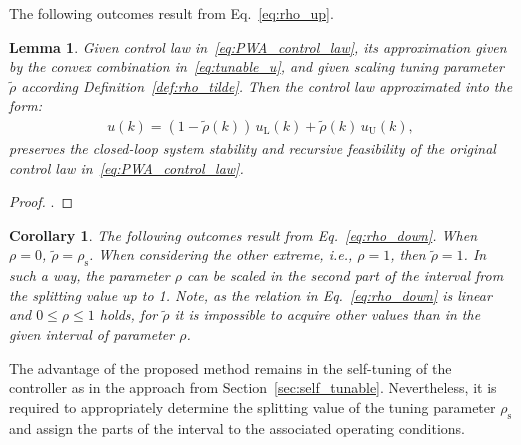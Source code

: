 \documentclass[preprint,12pt]{elsarticle}
\newtheorem{lemma}{Lemma}[theorem]
\newtheorem{corollary}{Corollary}[theorem]
\begin{document}
	The following outcomes result from Eq.~\eqref{eq:rho_up}. 
	
	\begin{lemma}
		\label{lem:PWA_control_law_interval}
		Given control law in~\eqref{eq:PWA_control_law}, its approximation given by the convex combination in~\eqref{eq:tunable_u}, and given scaling tuning parameter $\widetilde{\rho}$ according Definition~\ref{def:rho_tilde}. Then the control law  approximated into the form:
		\begin{eqnarray}
			\label{eq:PWA_control_law_interval}
			u(k) = (1-\widetilde{\rho}(k)) \, u_\mathrm{L}(k) + \widetilde{\rho}(k) \, u_\mathrm{U}(k),
		\end{eqnarray}
		preserves the closed-loop system stability and recursive feasibility of the original control law in~\eqref{eq:PWA_control_law}.
	\end{lemma}
	
	\begin{proof}
		\label{proof:rho_tilde}
		. 
	\end{proof}
	
	

	
	\begin{corollary}
		The following outcomes result from Eq.~\eqref{eq:rho_down}. When $\rho=0$, $\widetilde{\rho} = \rho_{\mathrm{s}}$. When considering the other extreme, i.e., $\rho=1$, then $\widetilde{\rho} = 1$. In such a way, the parameter $\rho$ can be scaled in the second part of the interval from the splitting value up to 1. Note, as the relation in Eq.~\eqref{eq:rho_down} is linear and $0 \le \rho \le 1$ holds, for $\widetilde{\rho}$ it is impossible to acquire other values than in the given interval of parameter $\rho$.
	\end{corollary}
	
	The advantage of the proposed method remains in the self-tuning of the controller as in the approach from Section~\ref{sec:self_tunable}. Nevertheless, it is required to appropriately determine the splitting value of the tuning parameter $\rho_{\mathrm{s}}$ and assign the parts of the interval to the associated operating conditions.
		
\end{document}
